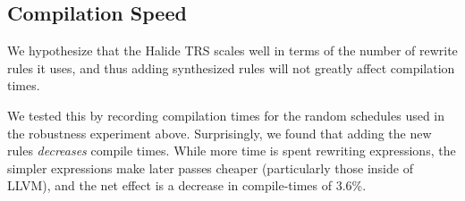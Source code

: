 \documentclass[sigplan,10pt,review,anonymous]{acmart}\settopmatter{printfolios=true,printccs=false,printacmref=false}
\begin{document}
\subsection{Compilation Speed}
\label{ssec:compilationspeed}

We hypothesize that the Halide TRS scales well in terms of the number of
rewrite rules it uses, and thus adding synthesized rules will not greatly affect
compilation times.

We tested this by recording compilation times for the random schedules
used in the robustness experiment above. Surprisingly, we found that
adding the new rules \emph{decreases} compile times. While more time
is spent rewriting expressions, the simpler expressions make later
passes cheaper (particularly those inside of LLVM), and the net
effect is a decrease in compile-times of 3.6\%.





\end{document}
